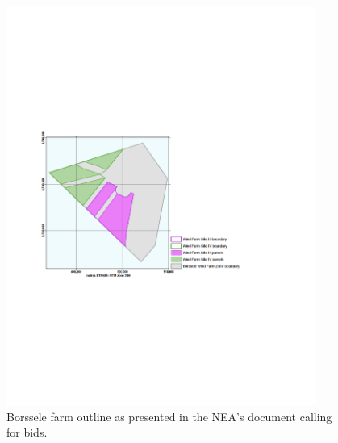 \begin{figure}
	\centering
	\begin{minipage}{0.45\textwidth}
		\centering
		\includegraphics[width=0.9\textwidth, trim=0.9in 3.4in 2.0in 3.3in, clip]{./figures/BorselleBoundary.pdf} %
		\caption{Borssele farm outline as presented in the NEA's document calling for bids.\cite{BorsseleAnnouncement}}
		\label{fig:farmoutline}
	\end{minipage}\hfill
	\begin{minipage}{0.45\textwidth}
		\centering

\end{minipage}
\end{figure}
